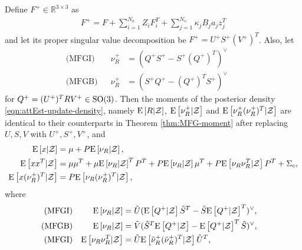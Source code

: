 \begin{theorem} \label{thm:attEst-update-moments}
	Define $F^+\in\mathbb{R}^{3\times 3}$ as
	\begin{align} \label{eqn:attEst-update-F}
		F^+ = F + \sum_{i=1}^{N_a}Z_iF_i^T + \sum_{j=1}^{N_v}\kappa_jB_ja_jz_j^T
	\end{align}
	and let its proper singular value decomposition be $F^+ = U^+ S^+ (V^+)^T$.
	Also, let
	\begin{subequations}
		\begin{flalign}
			\text{(MFGI)} && \nu^+_R &= (Q^+S^+-S^+(Q^+)^T)^\vee && \\
			\text{(MFGB)} && \nu^+_R &= (S^+Q^+-(Q^+)^TS^+)^\vee &&
		\end{flalign}
	\end{subequations}
	for $Q^+ = (U^+)^T R V^+\in\mathrm{SO}(3)$.
	Then the moments of the posterior density \eqref{eqn:attEst-update-density}, namely $\mathrm{E}\left[  R\lvert \mathcal{Z}  \right]$, $\mathrm{E}\left[  \nu^+_R\lvert \mathcal{Z}  \right]$ and $\mathrm{E}\left[  \nu^+_R(\nu^+_R)^T\lvert \mathcal{Z}  \right]$ are identical to their counterparts in Theorem \ref{thm:MFG-moment} after replacing $U,S,V$ with $U^+,S^+,V^+$, and
	\begin{align}
		\mathrm{E}\left[  x \lvert \mathcal{Z}  \right] & = {\mu}+P\mathrm{E}\left[  \nu_R \lvert \mathcal{Z}  \right], \label{eqn:attEst-update-Ex} \\
		\mathrm{E}\left[  xx^T \lvert \mathcal{Z}  \right] & = {\mu}{\mu}^T+{\mu}\mathrm{E}\left[  \nu_R \lvert \mathcal{Z}  \right]^TP^T+P\mathrm{E}\left[  \nu_R \lvert \mathcal{Z}  \right]{\mu}^T 
		+P\mathrm{E}\left[  \nu_R\nu_R^T \lvert \mathcal{Z}  \right]P^T+{\Sigma}_c,\\
		\mathrm{E}\left[  x(\nu^+_R)^T \lvert \mathcal{Z}  \right] & = P\mathrm{E}\left[  \nu_R(\nu^+_R)^T \lvert \mathcal{Z}  \right] \label{eqn:attEst-update-Exv'R},
	\end{align}
	where
	\begin{subequations}
		\renewcommand{\theparentequation}{\arabic{parentequation}}
		\begin{flalign} \label{eqn:attEst-update-EvR}
			\text{(MFGI)} && \expect{\nu_R|\mathcal{Z}} &= \tilde{U}(\expect{Q^+|\mathcal{Z}}\tilde{S}^T - \tilde{S}\expect{Q^+|\mathcal{Z}}^T)^\vee, && \\
			\text{(MFGB)} && \expect{\nu_R|\mathcal{Z} } &= \tilde{V}(\tilde{S}^T\expect{Q^+|\mathcal{Z}} - \expect{Q^+|\mathcal{Z}}^T\tilde{S})^\vee, && \\ \StepSubequations
			\text{(MFGI)} && \expect{\nu_R\nu_R^T|\mathcal{Z}} &= \tilde{U} \expect{\tilde{\nu}_R^+(\tilde{\nu}_R^+)^T|\mathcal{Z}} \tilde{U}^T, && \\

\end{flalign}
\end{subequations}
\end{theorem}
